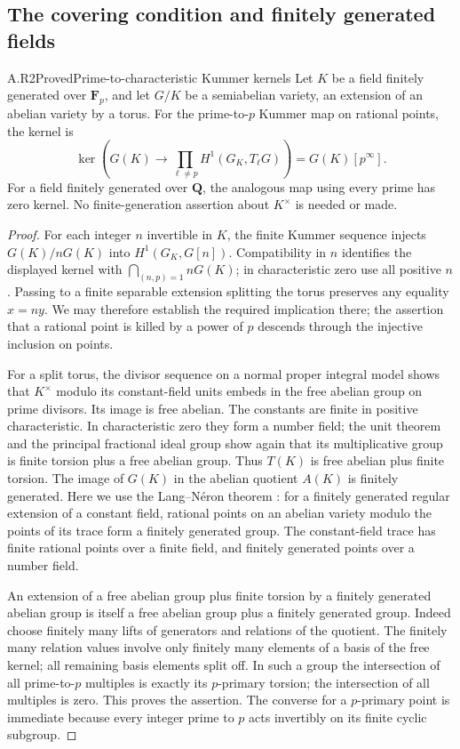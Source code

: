 \subsection{The covering condition and finitely generated fields}

\begin{claim}{A.R2}{Proved}{Prime-to-characteristic Kummer kernels}
Let $K$ be a field finitely generated over $\mathbf F_p$, and let $G/K$
be a semiabelian variety, an extension of an abelian variety by a torus.
For the prime-to-$p$ Kummer map on rational points, the kernel is
\[
 \ker\left(G(K)\longrightarrow
       \prod_{\ell\ne p}H^1(G_K,T_\ell G)\right)=G(K)[p^\infty].
\]
For a field finitely generated over $\mathbf Q$, the analogous map
using every prime has zero kernel. No finite-generation assertion
about $K^\times$ is needed or made.
\end{claim}
\begin{proof}
For each integer $n$ invertible in $K$, the finite Kummer sequence
injects $G(K)/nG(K)$ into $H^1(G_K,G[n])$. Compatibility in $n$
identifies the displayed kernel with
$\bigcap_{(n,p)=1}nG(K)$; in characteristic zero use all positive $n$.
Passing to a finite separable extension splitting the torus preserves
any equality $x=ny$. We may therefore establish the required
implication there; the assertion that a rational point is killed by
a power of $p$ descends through the injective inclusion on points.

For a split torus, the divisor sequence on a normal proper integral
model shows that $K^\times$ modulo its constant-field units embeds in
the free abelian group on prime divisors. Its image is free abelian.
The constants are finite in positive characteristic. In characteristic
zero they form a number field; the unit theorem and the principal
fractional ideal group show again that its multiplicative group is
finite torsion plus a free abelian group. Thus $T(K)$ is free abelian
plus finite torsion. The image of $G(K)$ in the abelian quotient $A(K)$
is finitely generated. Here we use the Lang--N\'eron theorem
\cite[Theorem 2.1]{Conrad2006}: for a finitely generated regular
extension of a constant field, rational points on an abelian variety
modulo the points of its trace form a finitely generated group. The
constant-field trace has finite rational points over a finite field,
and finitely generated points over a number field.

An extension of a free abelian group plus finite torsion by a finitely
generated abelian group is itself a free abelian group plus a finitely
generated group. Indeed choose finitely many lifts of generators and
relations of the quotient. The finitely many relation values involve
only finitely many elements of a basis of the free kernel; all remaining
basis elements split off. In such a group the intersection of all
prime-to-$p$ multiples is exactly its $p$-primary torsion; the
intersection of all multiples is zero. This proves the assertion.
The converse for a $p$-primary point is immediate because every integer
prime to $p$ acts invertibly on its finite cyclic subgroup.
\end{proof}


